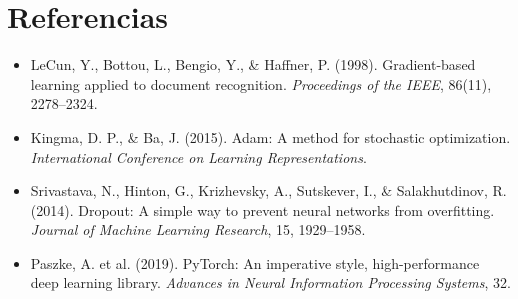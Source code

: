 \documentclass[11pt,letterpaper]{article}
\begin{document}
\section{Referencias}
\begin{itemize}
    \item LeCun, Y., Bottou, L., Bengio, Y., \& Haffner, P. (1998). Gradient-based learning applied to document recognition. \textit{Proceedings of the IEEE}, 86(11), 2278--2324.
    \item Kingma, D. P., \& Ba, J. (2015). Adam: A method for stochastic optimization. \textit{International Conference on Learning Representations}.
    \item Srivastava, N., Hinton, G., Krizhevsky, A., Sutskever, I., \& Salakhutdinov, R. (2014). Dropout: A simple way to prevent neural networks from overfitting. \textit{Journal of Machine Learning Research}, 15, 1929--1958.
    \item Paszke, A. et al. (2019). PyTorch: An imperative style, high-performance deep learning library. \textit{Advances in Neural Information Processing Systems}, 32.
\end{itemize}
\end{document}
